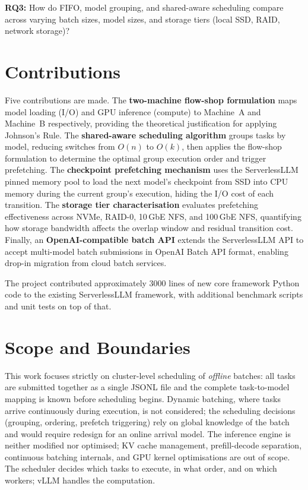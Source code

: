 \documentclass[logo,bsc,singlespacing,parskip,online]{infthesis}
\begin{document}
\textbf{RQ3:} How do FIFO, model grouping, and shared-aware scheduling compare across varying batch sizes, model sizes, and storage tiers (local SSD, RAID, network storage)?

\section{Contributions}

Five contributions are made. The \textbf{two-machine flow-shop formulation} maps model loading (I/O) and GPU inference (compute) to Machine~A and Machine~B respectively, providing the theoretical justification for applying Johnson's Rule. The \textbf{shared-aware scheduling algorithm} groups tasks by model, reducing switches from $O(n)$ to $O(k)$, then applies the flow-shop formulation to determine the optimal group execution order and trigger prefetching. The \textbf{checkpoint prefetching mechanism} uses the ServerlessLLM pinned memory pool to load the next model's checkpoint from SSD into CPU memory during the current group's execution, hiding the I/O cost of each transition. The \textbf{storage tier characterisation} evaluates prefetching effectiveness across NVMe, RAID-0, 10\,GbE NFS, and 100\,GbE NFS, quantifying how storage bandwidth affects the overlap window and residual transition cost. Finally, an \textbf{OpenAI-compatible batch API} extends the ServerlessLLM API to accept multi-model batch submissions in OpenAI Batch API format, enabling drop-in migration from cloud batch services.

The project contributed approximately 3000 lines of new core framework Python code to the existing ServerlessLLM framework, with additional benchmark scripts and unit tests on top of that.

\section{Scope and Boundaries}

This work focuses strictly on cluster-level scheduling of \emph{offline} batches: all tasks are submitted together as a single JSONL file and the complete task-to-model mapping is known before scheduling begins. Dynamic batching, where tasks arrive continuously during execution, is not considered; the scheduling decisions (grouping, ordering, prefetch triggering) rely on global knowledge of the batch and would require redesign for an online arrival model. The inference engine is neither modified nor optimised; KV cache management, prefill-decode separation, continuous batching internals, and GPU kernel optimisations are out of scope. The scheduler decides which tasks to execute, in what order, and on which workers; vLLM handles the computation.  
\end{document}
